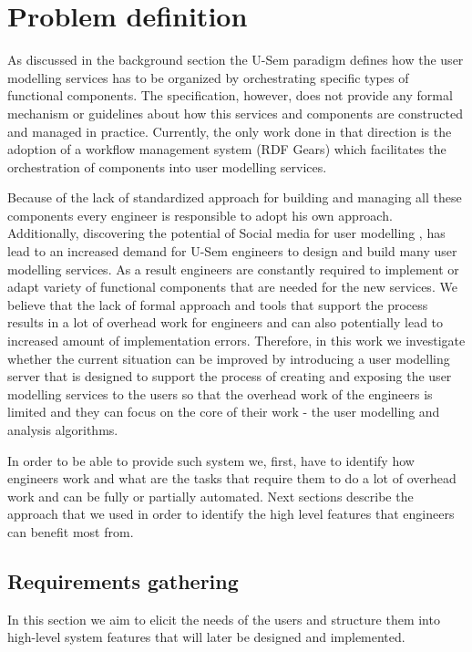 
\chapter{Problem definition}

As discussed in the background section the U-Sem paradigm defines how the user modelling services has to be organized by orchestrating specific types of functional components. The specification, however, does not provide any formal mechanism or guidelines about how this services and components are constructed and managed in practice. Currently, the only work done in that direction is the adoption of a workflow management system (RDF Gears) which facilitates the orchestration of components into user modelling services. 

Because of the lack of standardized approach for building and managing all these components every engineer is responsible to adopt his own approach. Additionally, discovering the potential of Social media for user modelling \cite{Brusilovsky07}, has lead to an increased demand for U-Sem engineers to design and build many user modelling services. As a result engineers are constantly required to implement or adapt variety of functional components that are needed for the new services. We believe that the lack of formal approach and tools that support the process results in a lot of overhead work for engineers and can also potentially lead to increased amount of implementation errors. Therefore, in this work we investigate whether the current situation can be improved by introducing a user modelling server that is designed to support the process of creating and exposing the user modelling services to the users so that the overhead work of the engineers is limited and they can focus on the core of their work - the user modelling and analysis algorithms.

In order to be able to provide such system we, first, have to identify how engineers work and what are the tasks that require them to do a lot of overhead work and can be fully or partially automated. Next sections describe the approach that we used in order to identify the high level features that engineers can benefit most from.

\section{Requirements gathering}

In this section we aim to elicit the needs of the users and structure them into high-level system features that will later be designed and implemented.

